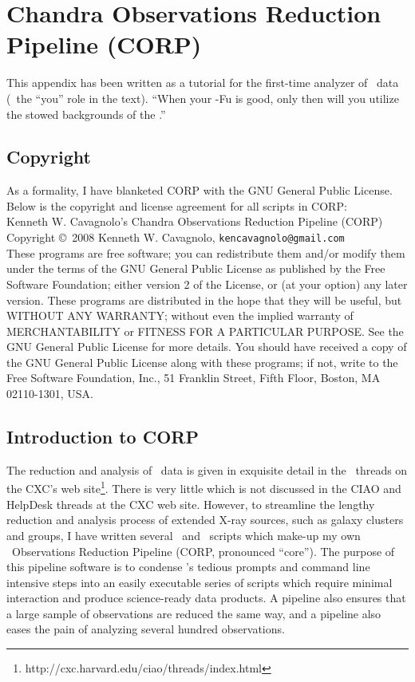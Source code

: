 
\chapter{Chandra Observations Reduction Pipeline (CORP)}
\label{ch:corp}

This appendix has been written as a tutorial for the first-time
analyzer of \chandra\ data (\eg\ the ``you'' role in the text). ``When
your \ciao-Fu is good, only then will you utilize the stowed
backgrounds of the \caldb.''

\section{Copyright}

As a formality, I have blanketed CORP with the GNU General Public
License. Below is the copyright and license agreement for all scripts
in CORP:\\
Kenneth W. Cavagnolo's Chandra Observations Reduction Pipeline (CORP)\\
Copyright \copyright\ 2008 Kenneth W. Cavagnolo, {\tt{kencavagnolo@gmail.com}}\\
These programs are free software; you can redistribute them and/or
modify them under the terms of the GNU General Public License as
published by the Free Software Foundation; either version 2 of the
License, or (at your option) any later version. These programs are
distributed in the hope that they will be useful, but WITHOUT ANY
WARRANTY; without even the implied warranty of MERCHANTABILITY or
FITNESS FOR A PARTICULAR PURPOSE. See the GNU General Public License
for more details. You should have received a copy of the GNU General
Public License along with these programs; if not, write to the Free
Software Foundation, Inc., 51 Franklin Street, Fifth Floor, Boston, MA
02110-1301, USA.

\section{Introduction to CORP}

The reduction and analysis of \chandra\ data is given in exquisite
detail in the \ciao\ threads on the CXC's
web site\footnote{http://cxc.harvard.edu/ciao/threads/index.html}.
There is very little which is not discussed in the CIAO and HelpDesk
threads at the CXC web site. However, to streamline the lengthy
reduction and analysis process of extended X-ray sources, such as
galaxy clusters and groups, I have written several \perl\ and
\idl\ scripts which make-up my own \chandra\ Observations Reduction
Pipeline (CORP, pronounced ``core''). The purpose of this pipeline
software is to condense \ciao's tedious prompts and command line
intensive steps into an easily executable series of scripts which
require minimal interaction and produce science-ready data products. A
pipeline also ensures that a large sample of observations are reduced
the same way, and a pipeline also eases the pain of analyzing several
hundred observations.

